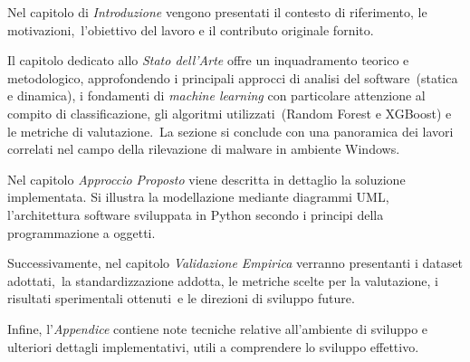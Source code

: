 Nel capitolo di \textit{Introduzione} vengono presentati il contesto di riferimento, le motivazioni,\
l'obiettivo del lavoro e il contributo originale fornito.

Il capitolo dedicato allo \textit{Stato dell’Arte} offre un inquadramento teorico e metodologico, approfondendo i principali approcci di analisi del software\
(statica e dinamica), i fondamenti di \textit{machine learning} con particolare attenzione al compito di classificazione, gli algoritmi utilizzati\
(Random Forest e XGBoost) e le metriche di valutazione.\
La sezione si conclude con una panoramica dei lavori correlati nel campo della rilevazione di malware in ambiente Windows.

Nel capitolo \textit{Approccio Proposto} viene descritta in dettaglio la soluzione implementata.
Si illustra la modellazione mediante diagrammi UML, l'architettura software sviluppata in Python secondo i principi della programmazione a oggetti.

Successivamente, nel capitolo \textit{Validazione Empirica} verranno presentanti i dataset adottati,\
la standardizzazione addotta, le metriche scelte per la valutazione, i risultati sperimentali ottenuti\
e le direzioni di sviluppo future.

Infine, l'\textit{Appendice} contiene note tecniche relative all'ambiente di sviluppo e ulteriori dettagli implementativi, utili a
comprendere lo sviluppo effettivo.
